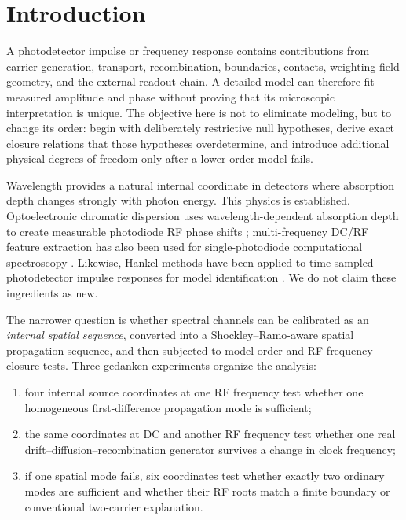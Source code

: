 \documentclass[11pt]{article}
\begin{document}
\begin{abstract}
\end{abstract}

\section{Introduction}

A photodetector impulse or frequency response contains contributions from carrier generation, transport, recombination, boundaries, contacts, weighting-field geometry, and the external readout chain. A detailed model can therefore fit measured amplitude and phase without proving that its microscopic interpretation is unique. The objective here is not to eliminate modeling, but to change its order: begin with deliberately restrictive null hypotheses, derive exact closure relations that those hypotheses overdetermine, and introduce additional physical degrees of freedom only after a lower-order model fails.

Wavelength provides a natural internal coordinate in detectors where absorption depth changes strongly with photon energy. This physics is established. Optoelectronic chromatic dispersion uses wavelength-dependent absorption depth to create measurable photodiode RF phase shifts \cite{Glasser2021}; multi-frequency DC/RF feature extraction has also been used for single-photodiode computational spectroscopy \cite{Kassa2026}. Likewise, Hankel methods have been applied to time-sampled photodetector impulse responses for model identification \cite{Sun2025}. We do not claim these ingredients as new.

The narrower question is whether spectral channels can be calibrated as an \emph{internal spatial sequence}, converted into a Shockley--Ramo-aware spatial propagation sequence, and then subjected to model-order and RF-frequency closure tests. Three gedanken experiments organize the analysis:
\begin{enumerate}[label=(\roman*)]
    \item four internal source coordinates at one RF frequency test whether one homogeneous first-difference propagation mode is sufficient;
    \item the same coordinates at DC and another RF frequency test whether one real drift--diffusion--recombination generator survives a change in clock frequency;
    \item if one spatial mode fails, six coordinates test whether exactly two ordinary modes are sufficient and whether their RF roots match a finite boundary or conventional two-carrier explanation.
\end{enumerate}
\end{document}
